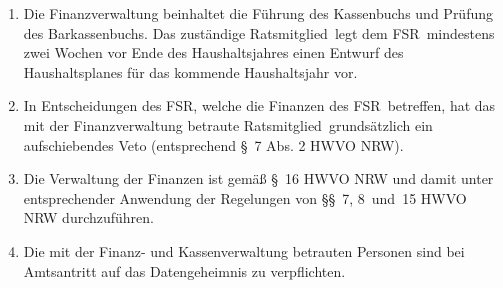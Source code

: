 \documentclass[a4paper, 12pt, ngerman]{article}
\newcommand{\rat}{FSR}
\newcommand{\rates}{FSR}
\newcommand{\mitglied}{Ratsmitglied}
\begin{document}
\begin{enumerate}[leftmargin=0cm]
	\begin{enumerate}[leftmargin=0cm]
		\item Die Finanzverwaltung beinhaltet die Führung des Kassenbuchs und Prüfung des Barkassenbuchs. Das zuständige \mitglied~legt dem \rat~mindestens zwei Wochen vor Ende des Haushaltsjahres einen Entwurf des Haushaltsplanes für das kommende Haushaltsjahr vor.
		\item In Entscheidungen des \rates, welche die Finanzen des \rates~betreffen, hat das mit der Finanzverwaltung betraute \mitglied~grundsätzlich ein aufschiebendes Veto (entsprechend §~7 Abs. 2 HWVO NRW).
		\item Die Verwaltung der Finanzen ist gemäß §~16 HWVO NRW und damit unter entsprechender Anwendung der Regelungen von §§~7, 8~und~15 HWVO NRW durchzuführen.
		\item Die mit der Finanz- und Kassenverwaltung betrauten Personen sind bei Amtsantritt auf das Datengeheimnis zu verpflichten.
	\end{enumerate}	
	

\end{enumerate}
\end{document}
